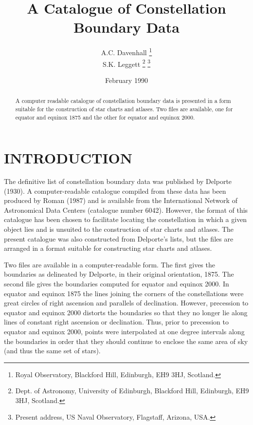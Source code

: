 %
%
%
%
\title{A Catalogue of Constellation Boundary Data}
\author{A.C. Davenhall \thanks{Royal Observatory, Blackford Hill,
           Edinburgh, EH9 3HJ, Scotland.}  \\
        S.K. Leggett \thanks{Dept. of Astronomy, University of
           Edinburgh, Blackford Hill, Edinburgh, EH9 3HJ, Scotland.}
           \thanks{Present address, US Naval Observatory, Flagstaff,
           Arizona, USA.}  }
\date{February 1990}

\setcounter{secnumdepth}{3}
\setcounter{tocdepth}{3}
%
%


\maketitle

\begin{abstract}
A computer readable catalogue of constellation boundary data is
presented in a form suitable for the construction of star charts and
atlases. Two files are available, one for equator and equinox 1875 and
the other for equator and equinox 2000.
\end{abstract}

\section{INTRODUCTION}

The definitive list of constellation boundary data was published by Delporte
(1930). A computer-readable catalogue compiled from these data has been produced
by Roman (1987) and is available from the International Network of Astronomical
Data Centers (catalogue number 6042). However, the format of this catalogue has
been chosen to facilitate locating the constellation in which a given object
lies and is unsuited to the construction of star charts and atlases. The present
catalogue was also constructed from Delporte's lists, but the files are arranged
in a format suitable for constructing star charts and atlases.

Two files are available in a computer-readable form. The first gives the
boundaries as delineated by Delporte, in their original orientation, 1875. The
second file gives the boundaries computed for equator and equinox 2000. In
equator and equinox 1875 the lines joining the corners of the constellations
were great circles of right ascension and parallels of declination. However,
precession to equator and equinox 2000 distorts the boundaries so that they no
longer lie along lines of constant right ascension or declination. Thus, prior
to precession to equator and equinox 2000, points were interpolated at one
degree intervals along the boundaries in order that they should continue to
enclose the same area of sky (and thus the same set of stars).

